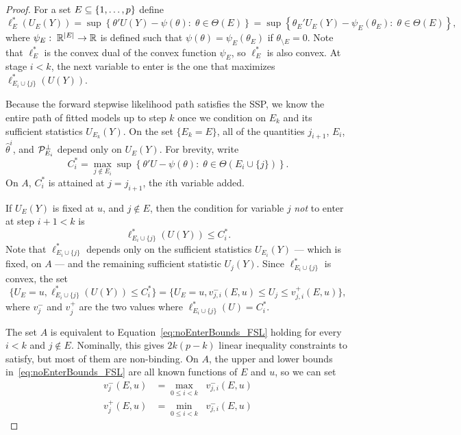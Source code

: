 \documentclass{article}
\begin{document}
\begin{proof}
  For a set $E\subseteq \{1,\ldots,p\}$ define
  \[
  \ell_E^*(U_E(Y)) 
  = \sup\left\{\theta'U(Y) - \psi(\theta) :\; \theta\in \Theta(E) \right\}
  = \sup\left\{\theta_E'U_E(Y) - \psi_E(\theta_E):\; \theta\in\Theta(E) \right\},
  \]
  where $\psi_E:\; \mathbb{R}^{|E|} \rightarrow \mathbb{R}$ is defined such that $\psi(\theta)=\psi_E(\theta_E)$ if $\theta_{\setminus E}=0$. Note that $\ell_E^*$ is the convex dual of the convex function $\psi_E$, so $\ell_E^*$ is also convex.  At stage $i<k$, the next variable to enter is the one that maximizes $\ell_{E_i\cup \{j\}}^*(U(Y))$.

  Because the forward stepwise likelihood path satisfies the SSP, we know the entire path of fitted models up to step $k$ once we condition on $E_k$ and its sufficient statistics $U_{E_k}(Y)$. On the set $\{E_k=E\}$, all of the quantities $j_{i+1}$, $E_i$, $\hat\theta^i$, and $\mathcal{P}_{E_i}^\perp$ depend only on $U_E(Y)$. For brevity, write 
  \[
  C_i^* = \max_{j \notin E_i} 
    \sup \left\{ \theta ' U - \psi(\theta):\; \theta \in \Theta(E_i\cup \{j\}) \right\}.
  \]
  On $A$, $C_i^*$ is attained at $j=j_{i+1}$, the $i$th variable added.

  If $U_E(Y)$ is fixed at $u$, and $j \notin E$, then the condition for 
  variable $j$ {\em not} to enter at step $i+1 < k$ is
  \[
  \ell_{E_i\cup \{j\}}^*(U(Y)) \leq C_i^*.
  \]
  Note that $\ell_{E_i\cup \{j\}}^*$ depends only on the sufficient statistics $U_{E_i}(Y)$ --- which is fixed, on $A$ --- and the remaining sufficient statistic $U_j(Y)$. Since $\ell_{E_i\cup\{j\}}^*$ is convex, the set
  \begin{equation}\label{eq:noEnterBounds_FSL}
  \{U_E=u, \ell_{E_i\cup \{j\}}^*(U(Y)) \leq C_i^*\} 
  = \{ U_E=u, v_{j,i}^-(E,u) \leq U_j \leq v_{j,i}^+(E,u)\},
  \end{equation}
  where $v_j^{-}$ and $v_j^+$ are the two values where $\ell_{E_i\cup \{j\}}^*(U)=C_i^*$.

  The set $A$ is equivalent to 
  Equation~\eqref{eq:noEnterBounds_FSL} holding
  for every $i < k$ and $j \notin E$. Nominally, this gives $2k(p-k)$
  linear inequality constraints to satisfy, but most of them are
  non-binding. On $A$, the upper and lower bounds
  in~\eqref{eq:noEnterBounds_FSL}
  are all known functions of $E$ and $u$, so we can set
  \begin{align}\label{eq:vMinus_FSL}
    v_j^-(E,u) &= \max_{0 \leq i < k} \;\;v_{j,i}^-(E,u)\\
    \label{eq:vPlus_FSL}
    v_j^+(E,u) &= \min_{0 \leq i < k} \;\;v_{j,i}^-(E,u)
  \end{align}
\end{proof}
\end{document}
